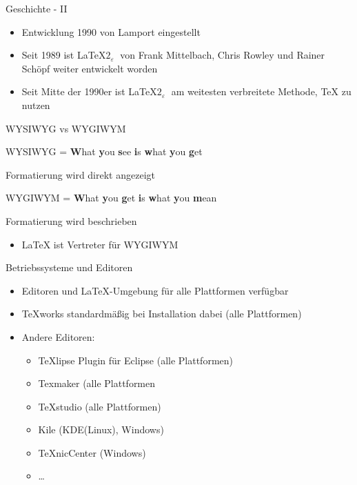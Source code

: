 \documentclass{beamer}
\begin{document}
\begin{frame}{Geschichte - II}
\begin{itemize}
\item Entwicklung 1990 von Lamport eingestellt
\item Seit 1989 ist \LaTeX $2_{\varepsilon}\;$ von Frank Mittelbach, Chris Rowley und Rainer Schöpf weiter entwickelt worden
\item Seit Mitte der 1990er ist \LaTeX $2_{\varepsilon}\;$ am weitesten verbreitete Methode, \TeX\; zu nutzen
\end{itemize}
\end{frame}

\begin{frame}{WYSIWYG vs WYGIWYM}

\begin{block}{WYSIWYG}
= \textbf{W}hat \textbf{y}ou \textbf{s}ee \textbf{i}s \textbf{w}hat \textbf{y}ou \textbf{g}et

Formatierung wird direkt angezeigt
\end{block}

\begin{block}{WYGIWYM}
= \textbf{W}hat \textbf{y}ou \textbf{g}et \textbf{i}s \textbf{w}hat \textbf{y}ou \textbf{m}ean

Formatierung wird beschrieben
\end{block}

\begin{itemize}
\item \LaTeX \; ist Vertreter für WYGIWYM
\end{itemize}
\end{frame}

\begin{frame}{Betriebssysteme und Editoren}

\begin{itemize}
\item Editoren und \LaTeX-Umgebung für alle Plattformen verfügbar
\item TeXworks standardmäßig bei Installation dabei (alle Plattformen)
\item Andere Editoren: 
	\begin{itemize}
	\item TeXlipse Plugin für Eclipse (alle Plattformen)
	\item Texmaker (alle Plattformen
	\item TeXstudio (alle Plattformen)
	\item Kile (KDE(Linux), Windows)
	\item TeXnicCenter (Windows)
	\item \ldots
	\end{itemize}
\end{itemize}

\end{frame}
\end{document}
